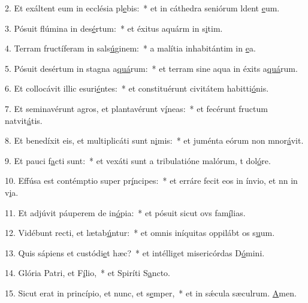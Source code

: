 2. Et exáltent eum in ecclésia pl\uline{e}bis:~* et in cáthedra seniórum ldent \uline{e}um.\par 
3. Pósuit flúmina in des\uline{é}rtum:~* et éxitus aquárm in s\uline{i}tim.\par 
4. Terram fructíferam in sals\uline{ú}ginem:~* a malítia inhabitántim in \uline{e}a.\par 
5. Pósuit desértum in stagna a\uline{quá}rum:~* et terram sine aqua in éxits a\uline{quá}rum.\par 
6. Et collocávit illic esuri\uline{é}ntes:~* et constituérunt civitátem habitti\uline{ó}nis.\par 
7. Et seminavérunt agros, et plantavérunt v\uline{í}neas:~* et fecérunt fructum natvit\uline{á}tis.\par 
8. Et benedíxit eis, et multiplicáti sunt n\uline{i}mis:~* et juménta eórum non mnor\uline{á}vit.\par 
9. Et pauci f\uline{a}cti sunt:~* et vexáti sunt a tribulatióne malórum, t dol\uline{ó}re.\par 
10. Effúsa est contémptio super pr\uline{í}ncipes:~* et erráre fecit eos in ínvio, et nn in v\uline{i}a.\par 
11. Et adjúvit páuperem de in\uline{ó}pia:~* et pósuit sicut ovs fam\uline{í}lias.\par 
12. Vidébunt recti, et lætab\uline{ú}ntur:~* et omnis iníquitas oppilábt os s\uline{u}um.\par 
13. Quis sápiens et custódi\uline{e}t hæc?~* et intélliget misericórdas D\uline{ó}mini.\par 
14. Glória Patri, et F\uline{í}lio,~* et Spiríti S\uline{a}ncto.\par 
15. Sicut erat in princípio, et nunc, et s\uline{e}mper,~* et in sǽcula sæculrum. \uline{A}men.\par 
